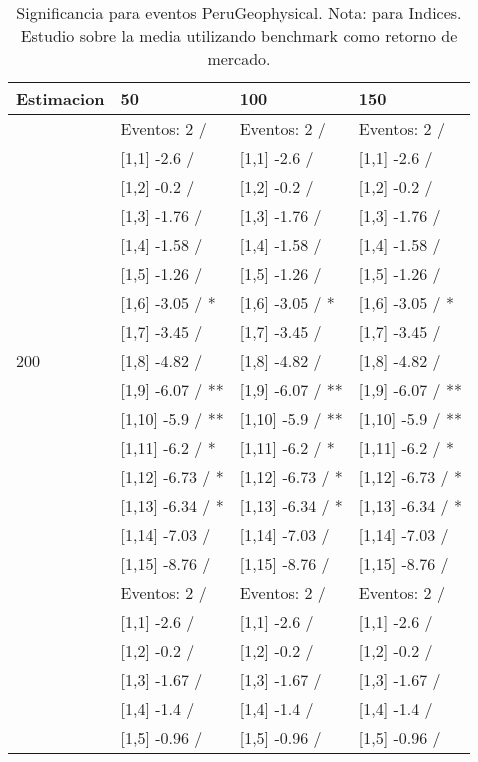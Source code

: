 \begin{table}

\caption{Significancia para eventos PeruGeophysical. Nota: para Indices. Estudio sobre la media utilizando benchmark como retorno de mercado.}
\centering
\begin{tabular}[t]{llll}
\toprule
Estimacion & 50 & 100 & 150\\
\midrule
 & Eventos:  2 / & Eventos:  2 / & Eventos:  2 /\\
 & {}[1,1] -2.6  / & {}[1,1] -2.6  / & {}[1,1] -2.6  /\\
 & {}[1,2] -0.2  / & {}[1,2] -0.2  / & {}[1,2] -0.2  /\\
 & {}[1,3] -1.76  / & {}[1,3] -1.76  / & {}[1,3] -1.76  /\\
 & {}[1,4] -1.58  / & {}[1,4] -1.58  / & {}[1,4] -1.58  /\\
\addlinespace
 & {}[1,5] -1.26  / & {}[1,5] -1.26  / & {}[1,5] -1.26  /\\
 & {}[1,6] -3.05  / * & {}[1,6] -3.05  / * & {}[1,6] -3.05  / *\\
 & {}[1,7] -3.45  / & {}[1,7] -3.45  / & {}[1,7] -3.45  /\\
200 & {}[1,8] -4.82  / & {}[1,8] -4.82  / & {}[1,8] -4.82  /\\
 & {}[1,9] -6.07  / ** & {}[1,9] -6.07  / ** & {}[1,9] -6.07  / **\\
\addlinespace
 & {}[1,10] -5.9  / ** & {}[1,10] -5.9  / ** & {}[1,10] -5.9  / **\\
 & {}[1,11] -6.2  / * & {}[1,11] -6.2  / * & {}[1,11] -6.2  / *\\
 & {}[1,12] -6.73  / * & {}[1,12] -6.73  / * & {}[1,12] -6.73  / *\\
 & {}[1,13] -6.34  / * & {}[1,13] -6.34  / * & {}[1,13] -6.34  / *\\
 & {}[1,14] -7.03  / & {}[1,14] -7.03  / & {}[1,14] -7.03  /\\
\addlinespace
 & {}[1,15] -8.76  / & {}[1,15] -8.76  / & {}[1,15] -8.76  /\\
 & Eventos:  2 / & Eventos:  2 / & Eventos:  2 /\\
 & {}[1,1] -2.6  / & {}[1,1] -2.6  / & {}[1,1] -2.6  /\\
 & {}[1,2] -0.2  / & {}[1,2] -0.2  / & {}[1,2] -0.2  /\\
 & {}[1,3] -1.67  / & {}[1,3] -1.67  / & {}[1,3] -1.67  /\\
\addlinespace
 & {}[1,4] -1.4  / & {}[1,4] -1.4  / & {}[1,4] -1.4  /\\
 & {}[1,5] -0.96  / & {}[1,5] -0.96  / & {}[1,5] -0.96  /\\

\end{tabular}
\end{table}
